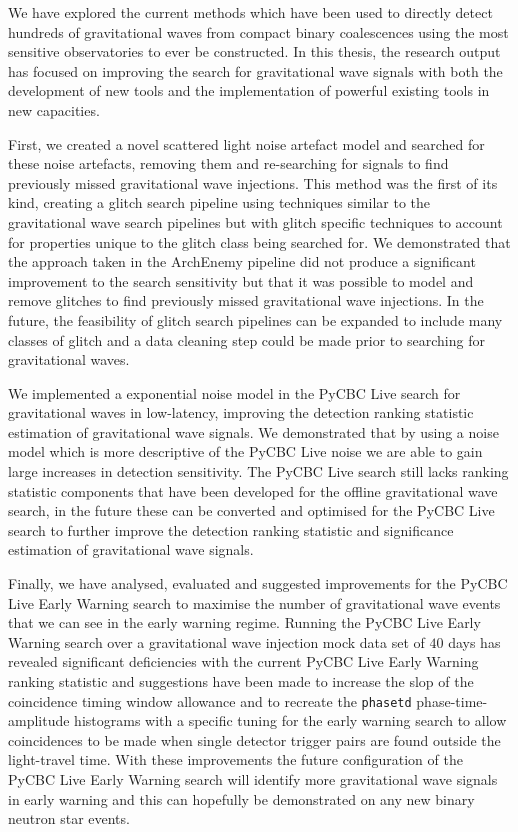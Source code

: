 We have explored the current methods which have been used to directly detect hundreds of gravitational waves from compact binary coalescences using the most sensitive observatories to ever be constructed. In this thesis, the research output has focused on improving the search for gravitational wave signals with both the development of new tools and the implementation of powerful existing tools in new capacities.

First, we created a novel scattered light noise artefact model and searched for these noise artefacts, removing them and re-searching for signals to find previously missed gravitational wave injections. This method was the first of its kind, creating a glitch search pipeline using techniques similar to the gravitational wave search pipelines but with glitch specific techniques to account for properties unique to the glitch class being searched for. We demonstrated that the approach taken in the ArchEnemy pipeline did not produce a significant improvement to the search sensitivity but that it was possible to model and remove glitches to find previously missed gravitational wave injections. In the future, the feasibility of glitch search pipelines can be expanded to include many classes of glitch and a data cleaning step could be made prior to searching for gravitational waves.

We implemented a exponential noise model in the PyCBC Live search for gravitational waves in low-latency, improving the detection ranking statistic estimation of gravitational wave signals. We demonstrated that by using a noise model which is more descriptive of the PyCBC Live noise we are able to gain large increases in detection sensitivity. The PyCBC Live search still lacks ranking statistic components that have been developed for the offline gravitational wave search, in the future these can be converted and optimised for the PyCBC Live search to further improve the detection ranking statistic and significance estimation of gravitational wave signals.

Finally, we have analysed, evaluated and suggested improvements for the PyCBC Live Early Warning search to maximise the number of gravitational wave events that we can see in the early warning regime. Running the PyCBC Live Early Warning search over a gravitational wave injection mock data set of $40$ days has revealed significant deficiencies with the current PyCBC Live Early Warning ranking statistic and suggestions have been made to increase the slop of the coincidence timing window allowance and to recreate the \verb|phasetd| phase-time-amplitude histograms with a specific tuning for the early warning search to allow coincidences to be made when single detector trigger pairs are found outside the light-travel time. With these improvements the future configuration of the PyCBC Live Early Warning search will identify more gravitational wave signals in early warning and this can hopefully be demonstrated on any new binary neutron star events.

